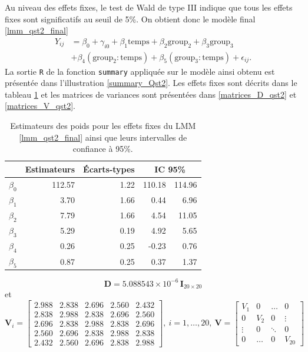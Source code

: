 \documentclass{article}
\begin{document}
	Au niveau des effets fixes, le test de Wald de type III indique que tous les effets fixes sont significatifs au seuil de 5\%. On obtient donc le modèle final \eqref{lmm_qst2_final}
	\begin{align}\label{lmm_qst2_final}
		Y_{ij} &= \beta_0 + \gamma_{i0} + \beta_1 \mathrm{temps} + \beta_2 \mathrm{group_2} + \beta_3 \mathrm{group_3}\\
		&+ \beta_4 (\mathrm{group_2:temps}) + \beta_5 (\mathrm{group_3:temps}) + \epsilon_{ij}. \nonumber
	\end{align}
	La sortie \texttt{R} de la fonction \texttt{summary} appliquée sur le modèle ainsi obtenu est présentée dans l'illustration \ref{summary_Qst2}. Les effets fixes sont décrits dans le tableau \ref{tbl_effets_fixes_qst2} et les matrices de variances sont présentées dans \eqref{matrices_D_qst2} et \eqref{matrices_V_qst2}.
	\begin{table}[ht]
		\centering
		\begin{tabular}{lrrrr}
			\hline
			& Estimateurs & Écarts-types &  \multicolumn{2}{c}{IC 95\%} \\ 
			\hline
			$\beta_0$ & 112.57 & 1.22 & 110.18 & 114.96 \\ 
			$\beta_1$ & 3.70 & 1.66 & 0.44 & 6.96 \\ 
			$\beta_2$ & 7.79 & 1.66 & 4.54 & 11.05 \\ 
			$\beta_3$ & 5.29 & 0.19 & 4.92 & 5.65 \\ 
			$\beta_4$ & 0.26 & 0.25 & -0.23 & 0.76 \\ 
			$\beta_5$ & 0.87 & 0.25 & 0.37 & 1.37 \\ 
			\hline
		\end{tabular}
		\caption{Estimateurs des poids pour les effets fixes du LMM \eqref{lmm_qst2_final} ainsi que leurs intervalles de confiance à 95\%.}
		\label{tbl_effets_fixes_qst2}
	\end{table}
	\begin{equation}\label{matrices_D_qst2}
		\boldsymbol{D} = 5.088543\times10^{-6}\, \boldsymbol{I}_{20\times 20}
	\end{equation}
	et
	\begin{equation}\label{matrices_V_qst2}
		\boldsymbol{V}_i = 
		\begin{bmatrix}
			2.988 & 2.838 & 2.696 & 2.560 & 2.432 \\
			2.838 & 2.988 & 2.838 & 2.696 & 2.560 \\
			2.696 & 2.838 & 2.988 & 2.838 & 2.696 \\
			2.560 & 2.696 & 2.838 & 2.988 & 2.838 \\
			2.432 & 2.560 & 2.696 & 2.838 & 2.988
		\end{bmatrix}, \ i=1,\dots,20,\ 
	\boldsymbol{V} = \begin{bmatrix}
		V_1 & 0 & \dots & 0 \\
		0 & V_2 & 0 & \vdots \\
		\vdots & 0 & \ddots & 0 \\
		0 & \dots & 0 & V_{20}
	\end{bmatrix}
	\end{equation}
			
\end{document}
